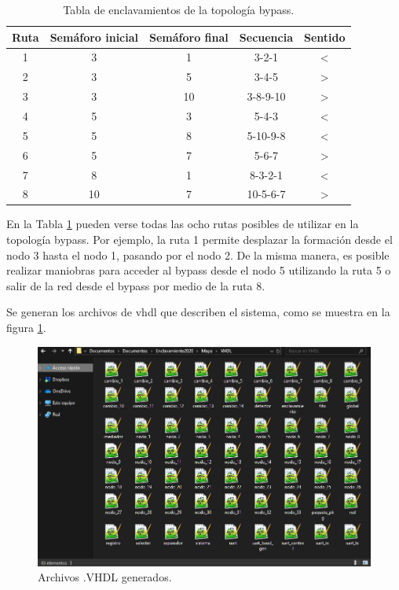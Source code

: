 	\begin{table}[!hbt]
	\caption{Tabla de enclavamientos de la topología bypass.}
	\label{tabla_bypass}
	\centering
	\begin{tabular}{ c  c  c  c  c }
	\hline
	Ruta & Semáforo inicial & Semáforo final & Secuencia & Sentido \\	
	\hline
		1 & 3 & 1 & 3-2-1 & < \\
		2 & 3 & 5 & 3-4-5 & > \\
		3 & 3 & 10 & 3-8-9-10 & > \\
		4 & 5 & 3 & 5-4-3 & < \\
		5 & 5 & 8 & 5-10-9-8 & < \\
		6 & 5 & 7 & 5-6-7 & > \\
		7 & 8 & 1 & 8-3-2-1 & < \\
		8 & 10 & 7 & 10-5-6-7 & > \\
	\end{tabular}
	\end{table}	
	
	En la Tabla \ref{tabla_bypass} pueden verse todas las ocho rutas posibles de utilizar en la topología bypass. Por ejemplo, la ruta 1 permite desplazar la formación desde el nodo 3 hasta el nodo 1, pasando por el nodo 2. De la misma manera, es posible realizar maniobras para acceder al bypass desde el nodo 5 utilizando la ruta 5 o salir de la red desde el bypass por medio de la ruta 8.
	
	Se generan los archivos de vhdl que describen el sistema, como se muestra en la figura \ref{fig:Bypass_3}.
	
	\begin{figure}[h]
	\centering
	\includegraphics[scale=0.55]{./Figures/Archivos}
		\caption{Archivos .VHDL generados.}
		\label{fig:Bypass_3}
	\end{figure}
	
